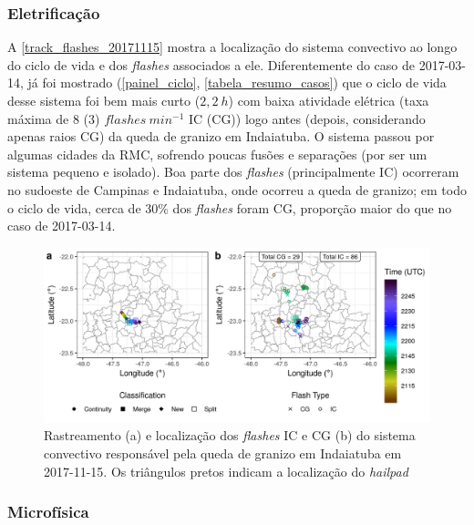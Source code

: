\subsubsection{Eletrificação}\label{elec_20171115}

A \autoref{track_flashes_20171115} mostra a localização do sistema convectivo ao longo do ciclo de vida e dos \textit{flashes} associados a ele. Diferentemente do caso de 2017-03-14, já foi mostrado (\autoref{painel_ciclo}, \autoref{tabela_resumo_casos}) que o ciclo de vida desse sistema foi bem mais curto ($2,2\:h$) com baixa atividade elétrica (taxa máxima de 8 (3) $flashes\:min^{-1}$ IC (CG)) logo antes (depois, considerando apenas raios CG) da queda de granizo em Indaiatuba. O sistema passou por algumas cidades da RMC, sofrendo poucas fusões e separações (por ser um sistema pequeno e isolado). Boa parte dos \textit{flashes} (principalmente IC) ocorreram no sudoeste de Campinas e Indaiatuba, onde ocorreu a queda de granizo; em todo o ciclo de vida, cerca de 30\% dos \textit{flashes} foram CG, proporção maior do que no caso de 2017-03-14.

\begin{figure}[htb]
	\begin{center}
		\caption{Rastreamento (a) e localização dos \textit{flashes} IC e CG (b) do sistema convectivo responsável pela queda de granizo em Indaiatuba em 2017-11-15. Os triângulos pretos indicam a localização do \textit{hailpad}} 
		\label{track_flashes_20171115}
		\includegraphics[width=\columnwidth]{../General_Processing/figures/track_flashes_20171115.png}
	\end{center}
\end{figure}

\subsubsection{Microfísica}\label{micro_20171115}

